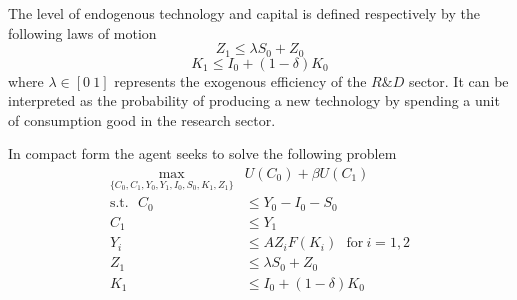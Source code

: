 \documentclass{article}
\begin{document}
	The level of endogenous technology and capital is defined respectively by the following laws of motion
	\begin{equation}
	Z_{1} \leq \lambda S_0 + Z_0
	\end{equation}
	\begin{equation}
	K_{1} \leq I_0 + (1 - \delta)K_0
	\end{equation}
	where $\lambda \in [0 \ 1]$ represents the exogenous efficiency of the $R\&D$ sector. It can be interpreted as the probability of producing a new technology by spending a unit of consumption good in the research sector.
	
	In compact form the agent seeks to solve the following problem
	\begin{equation}
	\begin{split}
	\max_{\{ C_0,C_1,Y_0,Y_1,I_0,S_0,K_{1},Z_{1} \}} &U(C_0) + \beta U(C_1) \\
	\text{s.t.} \ \ \ C_0 &\leq Y_0 - I_0 - S_0 \\
	C_1 &\leq Y_1 \\
	Y_i &\leq A Z_i F(K_i) \ \ \ \text{for} \ i = 1,2 \\
	Z_{1} &\leq \lambda S_0 + Z_0 \\
	K_{1} &\leq I_0 + (1 - \delta)K_0 \\
	\end{split}
	\end{equation}
	
\end{document}
